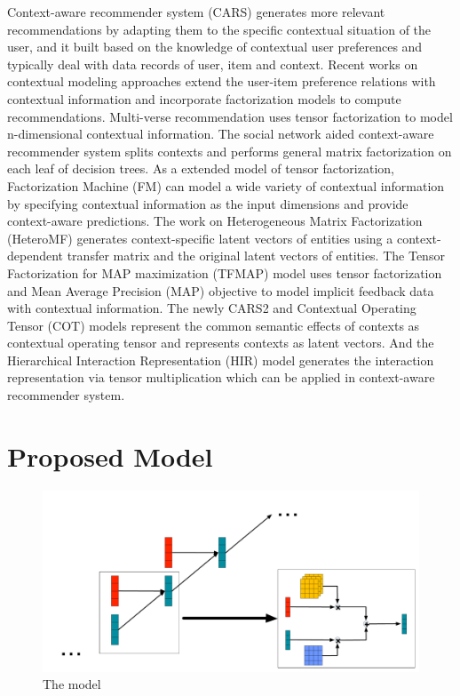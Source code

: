 \documentclass{sig-alternate}
\begin{document}
Context-aware recommender system (CARS) \cite{adomavicius2011context} generates more relevant recommendations by adapting them to the specific contextual situation of the user, and it built based on the knowledge of contextual user preferences and typically deal with data records of user, item and context. Recent works on contextual modeling approaches extend the user-item preference relations with contextual information and incorporate factorization models to compute recommendations. Multi-verse recommendation \cite{karatzoglou2010multiverse} uses tensor factorization to model n-dimensional contextual information. The social network aided context-aware recommender system \cite{liu2013soco} splits contexts and performs general matrix factorization on each leaf of decision trees. As a extended model of tensor factorization, Factorization Machine (FM) \cite{rendle2011fast} can model a wide variety of contextual information by specifying contextual information as the input dimensions and provide context-aware predictions. The work on Heterogeneous Matrix Factorization (HeteroMF) \cite{jamali2013heteromf} generates context-specific latent vectors of entities using a context-dependent transfer matrix and the original latent vectors of entities. The Tensor Factorization for MAP maximization (TFMAP) model \cite{shi2012tfmap} uses tensor factorization and Mean Average Precision (MAP) objective to model implicit feedback data with contextual information. The newly CARS2 \cite{shi2014cars} and Contextual Operating Tensor (COT) \cite{liu2015cot} models represent the common semantic effects of contexts as contextual operating tensor and represents contexts as latent vectors. And the Hierarchical Interaction Representation (HIR) model \cite{liu2015collaborative} generates the interaction representation via tensor multiplication which can be applied in context-aware recommender system.

\section{Proposed Model}

\begin{figure}[htb]
\centering
\includegraphics[width=1\linewidth]{./model.pdf}
\caption{The model}
\label{fig:Model-overview}
\end{figure}
\end{document}
